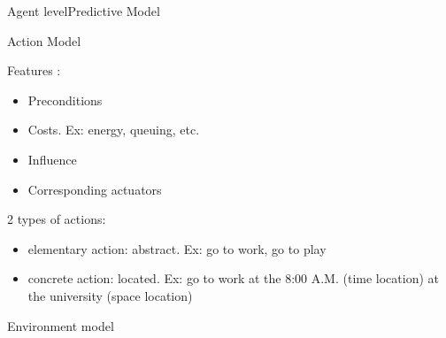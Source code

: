 \begin{frame}{Agent level}{Predictive Model}
\begin{block}{Action Model}
\par Features : 
\begin{itemize}
    \item Preconditions
    \item Costs. Ex: energy, queuing, etc.
    \item Influence
    \item Corresponding actuators
\end{itemize}
\vspace{.3cm}
\par 2 types of actions:
\begin{itemize}
    \item elementary action: abstract. Ex: go to work, go to play
    \item concrete action: located. Ex: go to work at the 8:00 A.M. (time location) at the university (space location)
\end{itemize}
\end{block}
\begin{block}{Environment model}
\end{block}


\end{frame}

